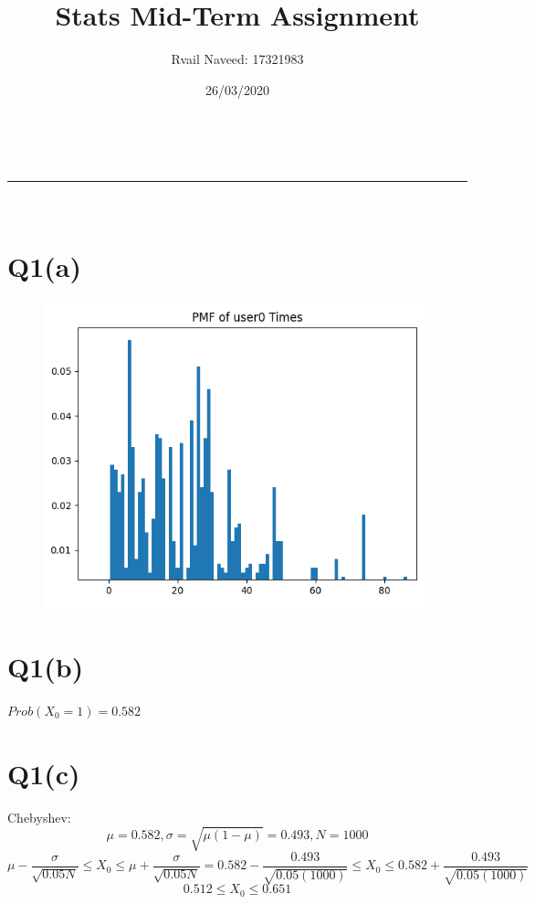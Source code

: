 \documentclass[a4paper,11pt]{article}
\makeatletter
\newcommand{\linia}{\rule{\linewidth}{0.5pt}}
\theoremstyle{mytheor}
\renewcommand{\maketitle}{
\begin{center}
\vspace{2ex}
{\huge \textsc{\@title}}
\vspace{1ex}
\\
\linia\\
\@author \hfill \@date
\vspace{4ex}
\end{center}
}
\makeatother
\begin{document}
\title{Stats Mid-Term Assignment}

\author{Rvail Naveed: 17321983}

\date{26/03/2020}

\maketitle

\section*{Q1(a)}
    \begin{figure}[h]
        \centering
        \includegraphics[scale=0.3]{pmf.png}
    \end{figure}

\section*{Q1(b)} 
    $Prob(X_0 = 1) = 0.582$ 

\section*{Q1(c)} 
    Chebyshev: 
    $$ \mu = 0.582,  \sigma = \sqrt{\mu(1-\mu)} = 0.493, N=1000 $$
    $$ \mu - \frac{\sigma}{\sqrt{0.05N}} \leq X_0 \leq \mu + \frac{\sigma}{\sqrt{0.05N}} = 0.582 - \frac{0.493}{\sqrt{0.05(1000)}} \leq X_0 \leq 0.582 + \frac{0.493}{\sqrt{0.05(1000)}}$$ 
    $$ 0.512 \leq X_0 \leq 0.651 $$ \newline
\end{document}
